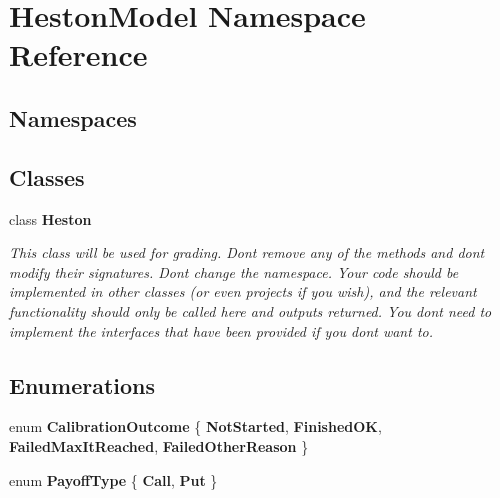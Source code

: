 \hypertarget{namespace_heston_model}{}\section{Heston\+Model Namespace Reference}
\label{namespace_heston_model}
\subsection*{Namespaces}
\begin{DoxyCompactItemize}
\end{DoxyCompactItemize}
\subsection*{Classes}
\begin{DoxyCompactItemize}
\item 
class {\bfseries Heston}
\begin{DoxyCompactList}\small\item\em This class will be used for grading. Don\textquotesingle{}t remove any of the methods and don\textquotesingle{}t modify their signatures. Don\textquotesingle{}t change the namespace. Your code should be implemented in other classes (or even projects if you wish), and the relevant functionality should only be called here and outputs returned. You don\textquotesingle{}t need to implement the interfaces that have been provided if you don\textquotesingle{}t want to. \end{DoxyCompactList}\end{DoxyCompactItemize}
\subsection*{Enumerations}
\begin{DoxyCompactItemize}
\item 
\mbox{\label{namespace_heston_model_a805ddee21a316d1a5b95541370992899}} 
enum {\bfseries Calibration\+Outcome} \{ {\bfseries Not\+Started}, 
{\bfseries Finished\+OK}, 
{\bfseries Failed\+Max\+It\+Reached}, 
{\bfseries Failed\+Other\+Reason}
 \}
\item 
\mbox{\label{namespace_heston_model_a1056fe29407b23edeec3e7905ce1deba}} 
enum {\bfseries Payoff\+Type} \{ {\bfseries Call}, 
{\bfseries Put}
 \}
\end{DoxyCompactItemize}
